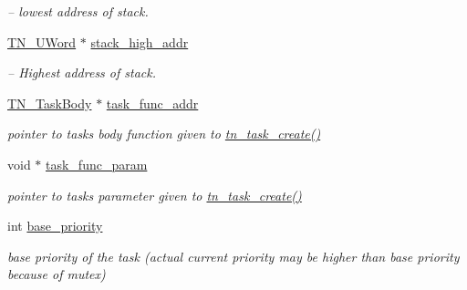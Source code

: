 \begin{DoxyCompactItemize}
\begin{DoxyCompactList}\small\item\em -- lowest address of stack. \end{DoxyCompactList}\item 
\hyperlink{tn__arch__example_8h_ab80cba0fe9ffcd9011d53dfeb9e39bf4}{T\+N\+\_\+\+U\+Word} $\ast$ \hyperlink{structTN__Task_a4497d6972b9a7706608708847d29aa46}{stack\+\_\+high\+\_\+addr}
\begin{DoxyCompactList}\small\item\em -- Highest address of stack. \end{DoxyCompactList}\item 
\mbox{\label{structTN__Task_a69c06e09b4d2a8a258f0733b58324139}} 
\hyperlink{tn__common_8h_a603cbe1ffdafc7e6813ef692bbd7d22f}{T\+N\+\_\+\+Task\+Body} $\ast$ \hyperlink{structTN__Task_a69c06e09b4d2a8a258f0733b58324139}{task\+\_\+func\+\_\+addr}
\begin{DoxyCompactList}\small\item\em pointer to task\textquotesingle{}s body function given to {\ttfamily \hyperlink{tn__tasks_8h_a548d5adda09d1b4e393b5df0e9e1a7a5}{tn\+\_\+task\+\_\+create()}} \end{DoxyCompactList}\item 
\mbox{\label{structTN__Task_a55c62af79c5b4fdc2f1b414d409afe73}} 
void $\ast$ \hyperlink{structTN__Task_a55c62af79c5b4fdc2f1b414d409afe73}{task\+\_\+func\+\_\+param}
\begin{DoxyCompactList}\small\item\em pointer to task\textquotesingle{}s parameter given to {\ttfamily \hyperlink{tn__tasks_8h_a548d5adda09d1b4e393b5df0e9e1a7a5}{tn\+\_\+task\+\_\+create()}} \end{DoxyCompactList}\item 
\mbox{\label{structTN__Task_a7775b785b3f0b57918e9a0c88491a069}} 
int \hyperlink{structTN__Task_a7775b785b3f0b57918e9a0c88491a069}{base\+\_\+priority}
\begin{DoxyCompactList}\small\item\em base priority of the task (actual current priority may be higher than base priority because of mutex) \end{DoxyCompactList}\item 
\mbox{\label{structTN__Task_a43c9c73249da8faa1177587786c40616}} 

\end{DoxyCompactItemize}
